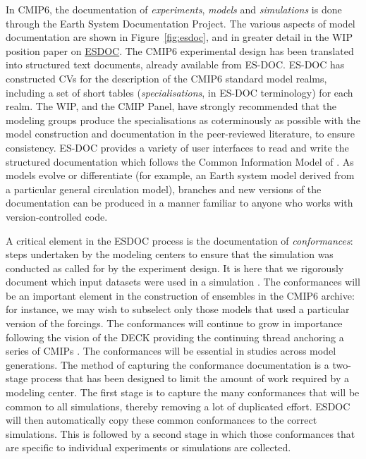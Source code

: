 \documentclass[gmd,manuscript]{copernicus}
\newcommand{\bibref}[1] { \cite{ref:#1}}
\newcommand{\figref}[1] {\mbox{Figure   \ref{fig:#1}}}
\begin{document}
In CMIP6, the documentation of \emph{experiments}, \emph{models} and
\emph{simulations} is done through the Earth System Documentation
\citep[\href{https://goo.gl/WNwKD9}{ES-DOC},][]{ref:guilyardietal2013}
Project. The various aspects of model documentation are shown in
\figref{esdoc}, and in greater detail in the WIP position paper on
\href{https://goo.gl/S3vVxE}{ESDOC}. The CMIP6 experimental design has
been translated into structured text documents, already available from
ES-DOC. ES-DOC has constructed CVs for the description of the CMIP6
standard model realms, including a set of short tables
(\emph{specialisations}, in ES-DOC terminology) for each realm. The
WIP, and the CMIP Panel, have strongly recommended that the modeling
groups produce the specialisations as coterminously as possible with
the model construction and documentation in the peer-reviewed
literature, to ensure consistency. ES-DOC provides a variety of user
interfaces to read and write the structured documentation which
follows the Common Information Model of \bibref{lawrenceetal2012}. As
models evolve or differentiate (for example, an Earth system model
derived from a particular general circulation model), branches and new
versions of the documentation can be produced in a manner familiar to
anyone who works with version-controlled code.

A critical element in the ESDOC process is the documentation of
\emph{conformances}: steps undertaken by the modeling centers to
ensure that the simulation was conducted as called for by the
experiment design. It is here that we rigorously document which input
datasets were used in a simulation \citep[e.g the version of each of
the forcing datasets, see][]{ref:duracketal2017}. The conformances
will be an important element in the construction of ensembles in the
CMIP6 archive: for instance, we may wish to subselect only those
models that used a particular version of the forcings. The
conformances will continue to grow in importance following the vision
of the DECK providing the continuing thread anchoring a series of
CMIPs \citep[viz. the well-known Figure~1 of][]{ref:eyringetal2016a}.
The conformances will be essential in studies across model
generations. The method of capturing the conformance documentation is
a two-stage process that has been designed to limit the amount of work
required by a modeling center. The first stage is to capture the many
conformances that will be common to all simulations, thereby removing
a lot of duplicated effort. ESDOC will then automatically copy these
common conformances to the correct simulations. This is followed by a
second stage in which those conformances that are specific to
individual experiments or simulations are collected.
\end{document}
